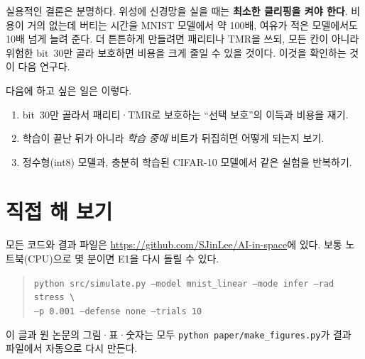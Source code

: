\documentclass[11pt,a4paper]{article}
\newcommand{\code}[1]{\texttt{#1}}
\begin{document}
실용적인 결론은 분명하다. 위성에 신경망을 실을 때는 \textbf{최소한 클리핑을 켜야 한다}. 비용이 거의 없는데 버티는 시간을 MNIST 모델에서 약 100배, 여유가 적은 모델에서도 10배 넘게 늘려 준다. 더 튼튼하게 만들려면 패리티나 TMR을 쓰되, 모든 칸이 아니라 위험한 bit~30만 골라 보호하면 비용을 크게 줄일 수 있을 것이다. 이것을 확인하는 것이 다음 연구다.

다음에 하고 싶은 일은 이렇다.
\begin{enumerate}[leftmargin=*,nosep]
  \item bit~30만 골라서 패리티·TMR로 보호하는 ``선택 보호''의 이득과 비용을 재기.
  \item 학습이 끝난 뒤가 아니라 \emph{학습 중에} 비트가 뒤집히면 어떻게 되는지 보기.
  \item 정수형(int8) 모델과, 충분히 학습된 CIFAR-10 모델에서 같은 실험을 반복하기.
\end{enumerate}

\section*{직접 해 보기}
모든 코드와 결과 파일은 \url{https://github.com/SJinLee/AI-in-space}에 있다. 보통 노트북(CPU)으로 몇 분이면 E1을 다시 돌릴 수 있다.
\begin{quote}\small
\code{python src/simulate.py --model mnist\_linear --mode infer --rad stress \textbackslash}\\
\code{\hspace*{2em}--p 0.001 --defense none --trials 10}
\end{quote}
이 글과 원 논문의 그림·표·숫자는 모두 \code{python paper/make\_figures.py}가 결과 파일에서 자동으로 다시 만든다.




\appendix
\end{document}
